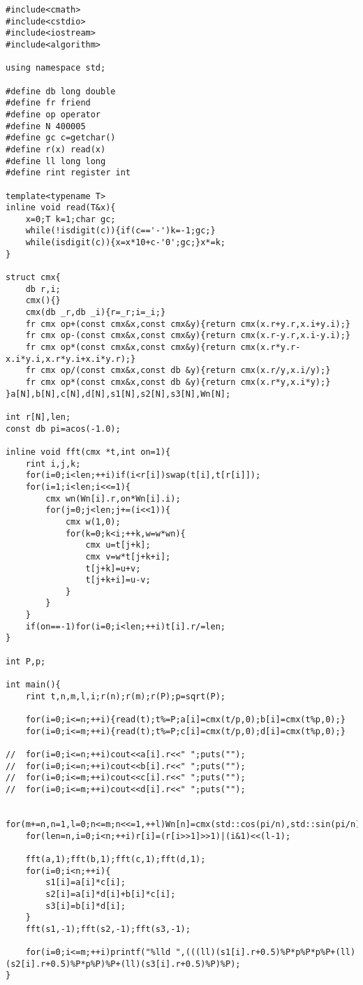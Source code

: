 \documentclass{ctexart}
\begin{document}
\begin{lstlisting}
#include<cmath>
#include<cstdio>
#include<iostream>
#include<algorithm>

using namespace std;

#define db long double
#define fr friend
#define op operator
#define N 400005
#define gc c=getchar()
#define r(x) read(x)
#define ll long long
#define rint register int

template<typename T>
inline void read(T&x){
    x=0;T k=1;char gc;
    while(!isdigit(c)){if(c=='-')k=-1;gc;}
    while(isdigit(c)){x=x*10+c-'0';gc;}x*=k;
}

struct cmx{
    db r,i;
    cmx(){}
    cmx(db _r,db _i){r=_r;i=_i;}
    fr cmx op+(const cmx&x,const cmx&y){return cmx(x.r+y.r,x.i+y.i);}
    fr cmx op-(const cmx&x,const cmx&y){return cmx(x.r-y.r,x.i-y.i);}
    fr cmx op*(const cmx&x,const cmx&y){return cmx(x.r*y.r-x.i*y.i,x.r*y.i+x.i*y.r);}
    fr cmx op/(const cmx&x,const db &y){return cmx(x.r/y,x.i/y);}
    fr cmx op*(const cmx&x,const db &y){return cmx(x.r*y,x.i*y);}
}a[N],b[N],c[N],d[N],s1[N],s2[N],s3[N],Wn[N];

int r[N],len;
const db pi=acos(-1.0);

inline void fft(cmx *t,int on=1){
    rint i,j,k;
    for(i=0;i<len;++i)if(i<r[i])swap(t[i],t[r[i]]);
    for(i=1;i<len;i<<=1){
        cmx wn(Wn[i].r,on*Wn[i].i);
        for(j=0;j<len;j+=(i<<1)){
            cmx w(1,0);
            for(k=0;k<i;++k,w=w*wn){
                cmx u=t[j+k];
                cmx v=w*t[j+k+i];
                t[j+k]=u+v;
                t[j+k+i]=u-v;
            }
        }
    }
    if(on==-1)for(i=0;i<len;++i)t[i].r/=len;
}

int P,p;

int main(){
    rint t,n,m,l,i;r(n);r(m);r(P);p=sqrt(P);
    
    for(i=0;i<=n;++i){read(t);t%=P;a[i]=cmx(t/p,0);b[i]=cmx(t%p,0);}
    for(i=0;i<=m;++i){read(t);t%=P;c[i]=cmx(t/p,0);d[i]=cmx(t%p,0);}
    
//	for(i=0;i<=n;++i)cout<<a[i].r<<" ";puts("");
//	for(i=0;i<=n;++i)cout<<b[i].r<<" ";puts("");
//	for(i=0;i<=m;++i)cout<<c[i].r<<" ";puts("");
//	for(i=0;i<=m;++i)cout<<d[i].r<<" ";puts("");
    
    for(m+=n,n=1,l=0;n<=m;n<<=1,++l)Wn[n]=cmx(std::cos(pi/n),std::sin(pi/n));
    for(len=n,i=0;i<n;++i)r[i]=(r[i>>1]>>1)|(i&1)<<(l-1);
    
    fft(a,1);fft(b,1);fft(c,1);fft(d,1);
    for(i=0;i<n;++i){
        s1[i]=a[i]*c[i];
        s2[i]=a[i]*d[i]+b[i]*c[i];
        s3[i]=b[i]*d[i];
    }
    fft(s1,-1);fft(s2,-1);fft(s3,-1);
    
    for(i=0;i<=m;++i)printf("%lld ",(((ll)(s1[i].r+0.5)%P*p%P*p%P+(ll)(s2[i].r+0.5)%P*p%P)%P+(ll)(s3[i].r+0.5)%P)%P);
}
\end{lstlisting}
\end{document}
